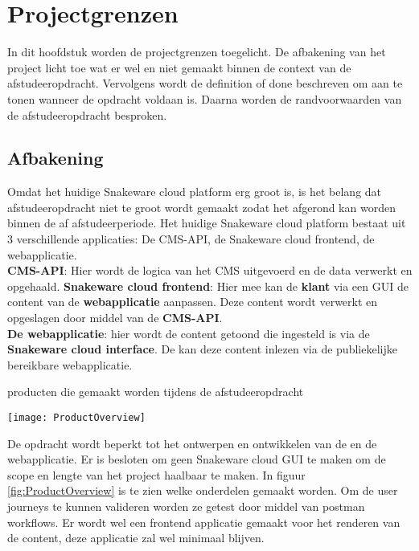 \chapter{Projectgrenzen}
In dit hoofdstuk worden de projectgrenzen toegelicht.
De afbakening van het project licht toe wat er wel en niet gemaakt binnen de context van de afstudeeropdracht.
Vervolgens wordt de definition of done beschreven om aan te tonen wanneer de opdracht voldaan is.
Daarna worden de randvoorwaarden van de afstudeeropdracht besproken.
\section{Afbakening}
Omdat het huidige Snakeware cloud platform erg groot is, is het belang dat afstudeeropdracht niet te groot wordt gemaakt zodat het afgerond kan worden binnen de af afstudeerperiode.
Het huidige Snakeware cloud platform bestaat uit 3 verschillende applicaties: De CMS-API, de Snakeware cloud frontend, de webapplicatie.\\
\textbf{CMS-API}: Hier wordt de logica van het CMS uitgevoerd en de data verwerkt en opgehaald.
\textbf{Snakeware cloud frontend}: Hier mee kan de \textbf{klant} via een \gls{GUI} de content van de \textbf{webapplicatie} aanpassen.
Deze content wordt verwerkt en opgeslagen door middel van de \textbf{\gls{CMS}-API}.\\
\textbf{De webapplicatie}: hier wordt de content getoond die ingesteld is via de \textbf{Snakeware cloud interface}.
De  kan deze content inlezen via de publiekelijke bereikbare webapplicatie.
\begin{graphic}
    \captionsetup{type=figure}
    \caption{producten die gemaakt worden tijdens de afstudeeropdracht}
    \texttt{[image: ProductOverview]}
    \label{fig:ProductOverview}
\end{graphic}
\whitespace
De opdracht wordt beperkt tot het ontwerpen en ontwikkelen van de  en de webapplicatie.
Er is besloten om geen Snakeware cloud \gls{GUI} te maken om de scope en lengte van het project haalbaar te maken.
In figuur \ref{fig:ProductOverview} is te zien welke onderdelen gemaakt worden.
Om de user journeys te kunnen valideren worden ze getest door middel van postman workflows.
Er wordt wel een frontend applicatie gemaakt voor het renderen van de content, deze applicatie zal wel minimaal blijven.
\whitespace
